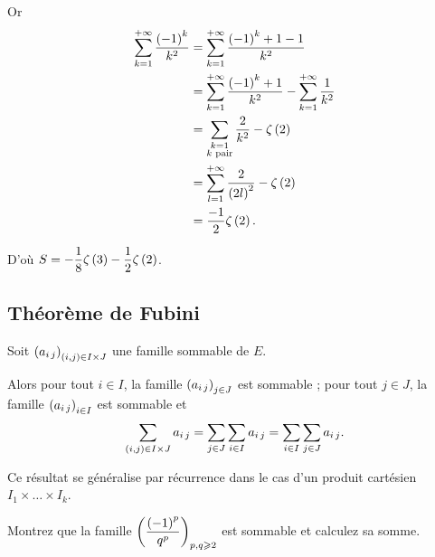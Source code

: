 \begin{corr}
Or \[\begin{aligned}
\sum_{k=1}^{+\infty}\dfrac{\left(-1\right)^k}{k^2}&=\sum_{k=1}^{+\infty}\dfrac{\left(-1\right)^k+1-1}{k^2} \\
&=\sum_{k=1}^{+\infty}\dfrac{\left(-1\right)^k+1}{k^2}-\sum_{k=1}^{+\infty}\dfrac{1}{k^2} \\
&=\sum_{\substack{k=1 \\ k\text{ pair}}}\dfrac{2}{k^2}-\zeta\left(2\right) \\
&=\sum_{l=1}^{+\infty}\dfrac{2}{\left(2l\right)^2}-\zeta\left(2\right) \\
&=\dfrac{-1}{2}\zeta\left(2\right).
\end{aligned}\]

D'où \(S=-\dfrac{1}{8}\zeta\left(3\right)-\dfrac{1}{2}\zeta\left(2\right)\).
\end{corr}

\subsection{Théorème de Fubini}

\begin{theo}
Soit \(\left(a_{i\,j}\right)_{\left(i,j\right)\in I\times J}\) une famille sommable de \(E\).

Alors pour tout \(i\in I\), la famille \(\left(a_{i\,j}\right)_{j\in J}\) est sommable ; pour tout \(j\in J\), la famille \(\left(a_{i\,j}\right)_{i\in I}\) est sommable et \[\sum_{\left(i,j\right)\in I\times J}a_{i\,j}=\sum_{j\in J}\sum_{i\in I}a_{i\,j}=\sum_{i\in I}\sum_{j\in J}a_{i\,j}.\]
\end{theo}

Ce résultat se généralise par récurrence dans le cas d'un produit cartésien \(I_1\times\dots\times I_k\).

\begin{exo}
Montrez que la famille \(\left(\dfrac{\left(-1\right)^p}{q^p}\right)_{p,q\geqslant2}\) est sommable et calculez sa somme.
\end{exo}

